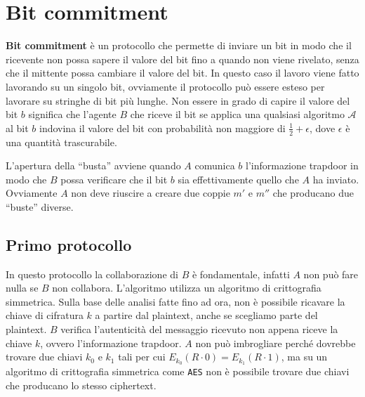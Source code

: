 \section{Bit commitment}
\textbf{Bit commitment} è un protocollo che permette di inviare un bit in modo che il ricevente
non possa sapere il valore del bit fino a quando non viene rivelato, senza che il mittente possa
cambiare il valore del bit. 
In questo caso il lavoro viene fatto lavorando su un singolo bit, ovviamente il protocollo può
essere esteso per lavorare su stringhe di bit più lunghe.
Non essere in grado di capire il valore del bit $b$ significa che l'agente $B$ che riceve il bit
se applica una qualsiasi algoritmo $\mathcal{A}$ al bit $b$ indovina il valore del bit con
probabilità non maggiore di $\frac{1}{2} + \epsilon$, dove $\epsilon$ è una quantità trascurabile.

L'apertura della ``busta'' avviene quando $A$ comunica $b$ l'informazione trapdoor in modo che
$B$ possa verificare che il bit $b$ sia effettivamente quello che $A$ ha inviato. Ovviamente 
$A$ non deve riuscire a creare due coppie $m'$ e $m''$ che producano due ``buste'' diverse. 
\subsection{Primo protocollo}
In questo protocollo la collaborazione di $B$ è fondamentale, infatti $A$ non può fare nulla
se $B$ non collabora. L'algoritmo utilizza un algoritmo di crittografia simmetrica.
Sulla base delle analisi fatte fino ad ora, non è possibile ricavare la 
chiave di cifratura $k$ a partire dal plaintext, anche se scegliamo parte 
del plaintext. 
$B$ verifica l'autenticità del messaggio ricevuto non appena riceve la chiave $k$, 
ovvero l'informazione trapdoor. 
$A$ non può imbrogliare perché dovrebbe trovare due chiavi $k_0$ e $k_1$ tali per cui
$E_{k_0}(R \cdot 0) = E_{k_1}(R \cdot 1)$, ma su un algoritmo di crittografia simmetrica
come \texttt{AES} non è possibile trovare due chiavi che producano lo stesso ciphertext.

